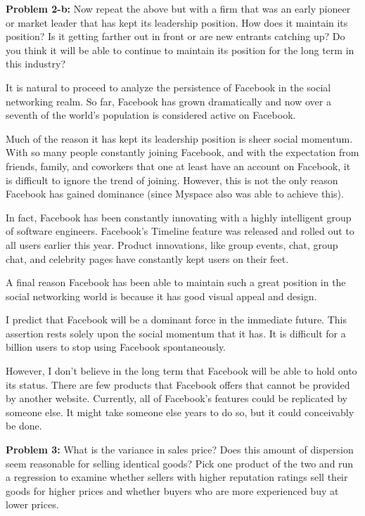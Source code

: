 \documentclass[psamsfonts]{amsart}
\newenvironment{sol}{\vspace{0.25cm}{\large \bfseries Solution:}}{\qedsymbol}
\newenvironment{prob}[1]{\begin{framed}{\large \bfseries Problem #1:}}{\end{framed}}
\begin{document}
\begin{prob}{2-b}
Now repeat the above but with a firm that was an early pioneer or market leader that has kept its leadership position. How does it maintain its position? Is it getting farther out in front or are new entrants catching up? Do you think it will be able to continue to maintain its position for the long term in this industry?
\end{prob}
\begin{sol}
It is natural to proceed to analyze the persistence of Facebook in the social networking realm. So far, Facebook has grown dramatically and now over a seventh of the world's population is considered active on Facebook. 

Much of the reason it has kept its leadership position is sheer social momentum. With so many people constantly joining Facebook, and with the expectation from friends, family, and coworkers that one at least have an account on Facebook, it is difficult to ignore the trend of joining. However, this is not the only reason Facebook has gained dominance (since Myspace also was able to achieve this). 

In fact, Facebook has been constantly innovating with a highly intelligent group of software engineers. Facebook's Timeline feature was released and rolled out to all users earlier this year. Product innovations, like group events, chat, group chat, and celebrity pages have constantly kept users on their feet.

A final reason Facebook has been able to maintain such a great position in the social networking world is because it has good visual appeal and design. 

I predict that Facebook will be a dominant force in the immediate future. This assertion rests solely upon the social momentum that it has. It is difficult for a billion users to stop using Facebook spontaneously.

However, I don't believe in the long term that Facebook will be able to hold onto its status. There are few products that Facebook offers that cannot be provided by another website. Currently, all of Facebook's features could be replicated by someone else. It might take someone else years to do so, but it could conceivably be done. 
\end{sol}
\newpage

\begin{prob}{3}
What is the variance in sales price? Does this amount of dispersion seem reasonable for selling identical goods? Pick one product of the two and run a regression to examine whether sellers with higher reputation ratings sell their goods for higher prices and whether buyers who are more experienced buy at lower prices.
\end{prob}
\end{document}
